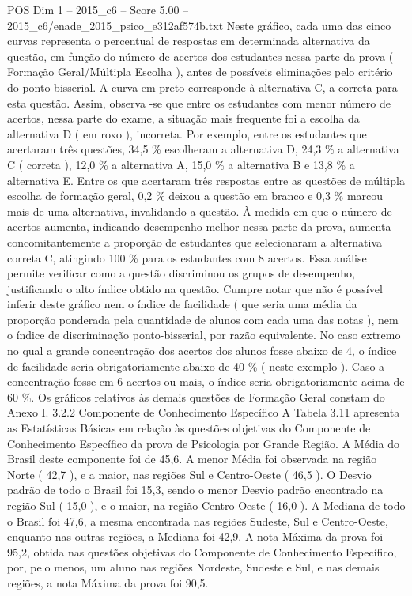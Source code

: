 \begin{textsample}{POS Dim 1 – 2015\_c6 – Score 5.00 – 2015\_c6/enade\_2015\_psico\_e312af574b.txt}
Neste gráfico, cada uma das cinco curvas representa o percentual de respostas em determinada alternativa da questão, em função do número de acertos dos estudantes nessa parte da prova ( Formação Geral/Múltipla Escolha ), antes de possíveis eliminações pelo critério do ponto-bisserial.
A curva em preto corresponde à alternativa C, a correta para esta questão.
Assim, observa -se que entre os estudantes com menor número de acertos, nessa parte do exame, a situação mais frequente foi a escolha da alternativa D ( em roxo ), incorreta.
Por exemplo, entre os estudantes que acertaram três questões, 34,5 \% escolheram a alternativa D, 24,3 \% a alternativa C ( correta ), 12,0 \% a alternativa A, 15,0 \% a alternativa B e 13,8 \% a alternativa E.
Entre os que acertaram três respostas entre as questões de múltipla escolha de formação geral, 0,2 \% deixou a questão em branco e 0,3 \% marcou mais de uma alternativa, invalidando a questão.
À medida em que o número de acertos aumenta, indicando desempenho melhor nessa parte da prova, aumenta concomitantemente a proporção de estudantes que selecionaram a alternativa correta C, atingindo 100 \% para os estudantes com 8 acertos.
Essa análise permite verificar como a questão discriminou os grupos de desempenho, justificando o alto índice obtido na questão.
Cumpre notar que não é possível inferir deste gráfico nem o índice de facilidade ( que seria uma média da proporção ponderada pela quantidade de alunos com cada uma das notas ), nem o índice de discriminação ponto-bisserial, por razão equivalente.
No caso extremo no qual a grande concentração dos acertos dos alunos fosse abaixo de 4, o índice de facilidade seria obrigatoriamente abaixo de 40 \% ( neste exemplo ).
Caso a concentração fosse em 6 acertos ou mais, o índice seria obrigatoriamente acima de 60 \%.
Os gráficos relativos às demais questões de Formação Geral constam do Anexo I. 3.2.2 Componente de Conhecimento Específico A Tabela 3.11 apresenta as Estatísticas Básicas em relação às questões objetivas do Componente de Conhecimento Específico da prova de Psicologia por Grande Região.
A Média do Brasil deste componente foi de 45,6.
A menor Média foi observada na região Norte ( 42,7 ), e a maior, nas regiões Sul e Centro-Oeste ( 46,5 ).
O Desvio padrão de todo o Brasil foi 15,3, sendo o menor Desvio padrão encontrado na região Sul ( 15,0 ), e o maior, na região Centro-Oeste ( 16,0 ).
A Mediana de todo o Brasil foi 47,6, a mesma encontrada nas regiões Sudeste, Sul e Centro-Oeste, enquanto nas outras regiões, a Mediana foi 42,9.
A nota Máxima da prova foi 95,2, obtida nas questões objetivas do Componente de Conhecimento Específico, por, pelo menos, um aluno nas regiões Nordeste, Sudeste e Sul, e nas demais regiões, a nota Máxima da prova foi 90,5.

\end{textsample}
